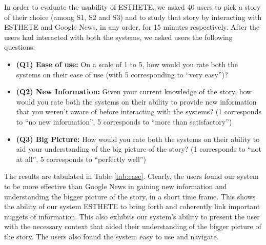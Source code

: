 \normalsize
In order to evaluate the usability of ESTHETE, we asked 40 users to pick a story of their choice (among S1, S2 and S3) and to study that story by interacting with ESTHETE and Google News, in any order, for 15 minutes respectively. After the users had interacted with both the systems, we asked users the following questions:

\begin{itemize}
	\item {\bf (Q1) Ease of use:} On a scale of 1 to 5, how would you rate both the systems on their ease of use (with 5 corresponding to ``very easy'')?
	\item {\bf (Q2) New Information:} Given your current knowledge of the story, how would you rate both the systems on their ability to provide new information that you weren't aware of before interacting with the systems? (1 corresponds to ``no new information'', 5 corresponds to ``more than satisfactory'')
	\item {\bf (Q3) Big Picture:} How would you rate both the systems on their ability to aid your understanding of the big picture of the story? (1 corresponds to ``not at all'', 5 corresponds to ``perfectly well'')
\end{itemize}

The results are tabulated in Table \ref{tab:ease}.
Clearly, the users found our system to be more effective than Google News in gaining new information and understanding the bigger picture of the story, in a short time frame. This shows the ability of our system ESTHETE to bring forth and coherently link important nuggets of information. This also exhibits our system's ability to present the user with the necessary context that aided their understanding of the bigger picture of the story. The users also found the system easy to use and navigate.


